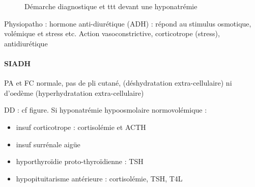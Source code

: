 \documentclass[11pt]{article}
\begin{document}
\begin{figure}[htpb]
  \centering
  \caption{Démarche diagnostique et ttt devant une hyponatrémie}
\end{figure}

Physiopatho : hormone anti-diurétique (ADH) : répond au stimulus osmotique,
volémique et stress etc. Action vasoconstrictive, corticotrope (stress),
antidiurétique

\paragraph{SIADH}
\label{sec:org1a9e433}
PA et FC normale, pas de pli cutané, (déshydratation extra-cellulaire) ni
d'oedème (hyperhydratation extra-cellulaire)

DD : cf figure. Si hyponatrémie hypoosmolaire normovolémique :
\begin{itemize}
\item insuf corticotrope : cortisolémie et ACTH
\item insuf surrénale aigüe
\item hyporthyroïdie proto-thyroïdienne : TSH \inc
\item hypopituitarisme antérieure : cortisolémie, TSH, T4L
\end{itemize}
\end{document}
